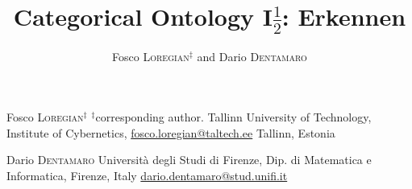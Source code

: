 \documentclass[a4paper,9pt]{../birkjour}
\title{Categorical Ontology I$\frac{1}{2}$: Erkennen}
\author{Fosco \textsc{Loregian}$^\ddag$ and Dario \textsc{Dentamaro}}
\begin{document}
\scriptsize

\maketitle

\begin{minipage}{.4\textwidth}
  Fosco \textsc{Loregian}$^\ddag$\newline 
  $^\ddag$corresponding author. \newline 
Tallinn University of Technology,\newline %
Institute of Cybernetics,\newline 
\url{fosco.loregian@taltech.ee}
Tallinn, Estonia 
\end{minipage}\hfill %
\begin{minipage}{.4\textwidth}
  Dario \textsc{Dentamaro} \newline 
  Università degli Studi di Firenze,\newline 
  Dip. di Matematica e Informatica, \newline 
  Firenze, Italy\newline
  \url{dario.dentamaro@stud.unifi.it}
\end{minipage}
\end{document}
